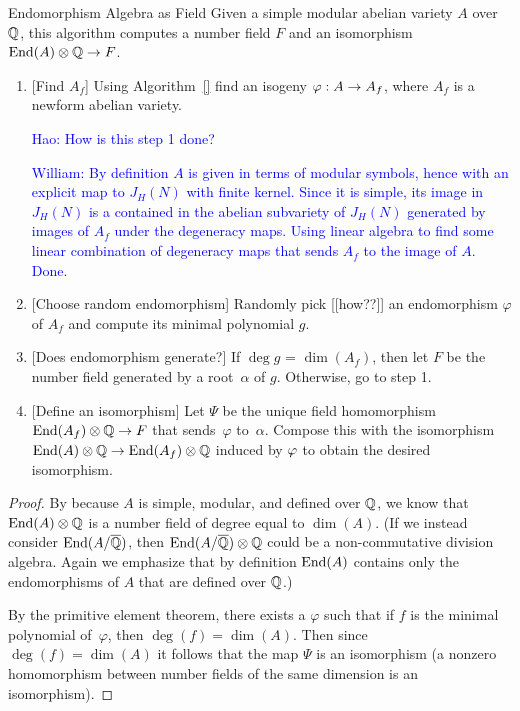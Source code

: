 \documentclass{article}
\newcommand{\Hao}[1]{\textcolor{blue}{\textsf{Hao: #1}}}
\newcommand{\wstein}[1]{\textcolor{blue}{\textsf{William: #1}}}
\begin{document}
\begin{algorithm}{Endomorphism Algebra as Field}
    Given a simple modular abelian variety $A$ over $\mathbb{Q}$,
    this algorithm computes a number field $F$ and an
    isomorphism $\operatorname{End}(A)\otimes\mathbb{Q} \to F$.
\begin{enumerate}

\item{} [Find $A_f$] Using Algorithm~\ref{} find an isogeny $\varphi:A\to A_f$,
where $A_f$ is a newform abelian variety.

\Hao{How is this step 1 done?}

\wstein{By definition $A$ is given in terms of modular symbols, hence with an explicit map to $J_H(N)$ with finite kernel.  Since it is simple, its image in $J_H(N)$ is a contained in the abelian subvariety of $J_H(N)$ generated by images of $A_f$ under the degeneracy maps.  Using linear algebra to find some linear combination of degeneracy maps that sends $A_f$ to the image of $A$. Done.}

\item{} [Choose random endomorphism] Randomly pick [[how??]] an endomorphism
  $\varphi$ of $A_f$ and compute its minimal polynomial $g$.
\item{} [Does endomorphism generate?]
If $\deg g$ = $\dim(A_f)$, then let $F$ be the
number field generated by a root~$\alpha$ of $g$.
Otherwise, go to step 1.
\item{} [Define an isomorphism] Let $\Psi$ be the unique field
  homomorphism $\operatorname{End}(A_f)\otimes\mathbb{Q} \to F$ that sends~$\varphi$
  to~$\alpha$.  Compose this with the isomorphism
$\operatorname{End}(A)\otimes\mathbb{Q} \to \operatorname{End}(A_f)\otimes\mathbb{Q}$ induced by $\varphi$
to obtain the desired isomorphism.

\end{enumerate}
\end{algorithm}
\begin{proof}

By \cite[???]{ribet:abvars} because $A$ is simple, modular, and defined over $\mathbb{Q}$,
we know that $\operatorname{End}(A)\otimes\mathbb{Q}$ is a number
field of degree equal to $\dim(A)$.  (If we instead consider $\operatorname{End}(A/\overline{\mathbb{Q}})$,
then $\operatorname{End}(A/\overline{\mathbb{Q}})\otimes\mathbb{Q}$ could be a non-commutative division algebra.
Again we emphasize that by definition $\operatorname{End}(A)$ contains only the endomorphisms
of $A$ that are defined over $\mathbb{Q}$.)

By the primitive element theorem, there exists a $\varphi$ such that
if $f$ is the minimal polynomial of~$\varphi$, then
$\deg(f) = \dim(A)$.
Then since $\deg(f) = \dim(A)$ it follows that the
map $\Psi$ is an isomorphism (a nonzero homomorphism between number
fields of the same dimension is an isomorphism).
\end{proof}
\end{document}
